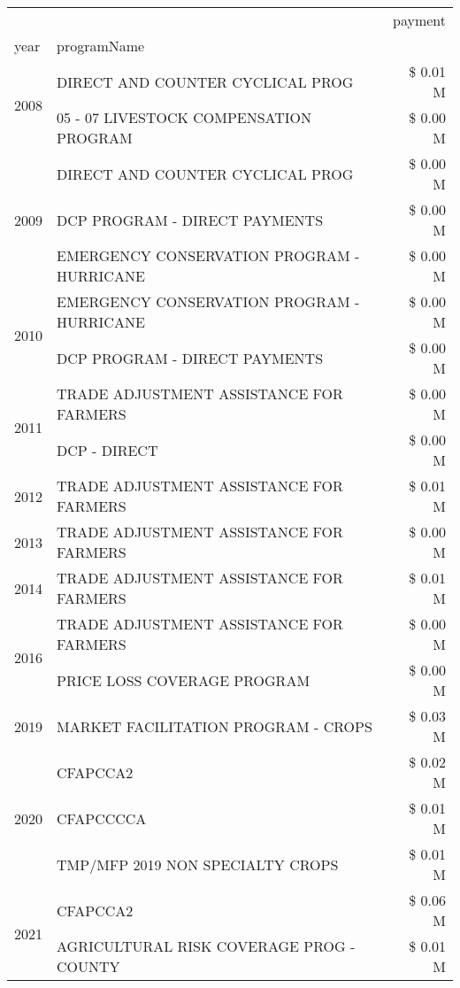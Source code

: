 \begin{tabular}{llr}
\toprule
 &  & payment \\
year & programName &  \\
\midrule
\multirow[t]{2}{*}{2008} & DIRECT AND COUNTER CYCLICAL PROG & \$ 0.01 M \\
 & 05 - 07 LIVESTOCK COMPENSATION PROGRAM & \$ 0.00 M \\
\cline{1-3}
\multirow[t]{3}{*}{2009} & DIRECT AND COUNTER CYCLICAL PROG & \$ 0.00 M \\
 & DCP PROGRAM - DIRECT PAYMENTS & \$ 0.00 M \\
 & EMERGENCY CONSERVATION PROGRAM - HURRICANE & \$ 0.00 M \\
\cline{1-3}
\multirow[t]{2}{*}{2010} & EMERGENCY CONSERVATION PROGRAM - HURRICANE & \$ 0.00 M \\
 & DCP PROGRAM - DIRECT PAYMENTS & \$ 0.00 M \\
\cline{1-3}
\multirow[t]{2}{*}{2011} & TRADE ADJUSTMENT ASSISTANCE FOR FARMERS & \$ 0.00 M \\
 & DCP - DIRECT & \$ 0.00 M \\
\cline{1-3}
2012 & TRADE ADJUSTMENT ASSISTANCE FOR FARMERS & \$ 0.01 M \\
\cline{1-3}
2013 & TRADE ADJUSTMENT ASSISTANCE FOR FARMERS & \$ 0.00 M \\
\cline{1-3}
2014 & TRADE ADJUSTMENT ASSISTANCE FOR FARMERS & \$ 0.01 M \\
\cline{1-3}
\multirow[t]{2}{*}{2016} & TRADE ADJUSTMENT ASSISTANCE FOR FARMERS & \$ 0.00 M \\
 & PRICE LOSS COVERAGE PROGRAM & \$ 0.00 M \\
\cline{1-3}
2019 & MARKET FACILITATION PROGRAM - CROPS & \$ 0.03 M \\
\cline{1-3}
\multirow[t]{3}{*}{2020} & CFAPCCA2 & \$ 0.02 M \\
 & CFAPCCCCA & \$ 0.01 M \\
 & TMP/MFP 2019 NON SPECIALTY CROPS & \$ 0.01 M \\
\cline{1-3}
\multirow[t]{2}{*}{2021} & CFAPCCA2 & \$ 0.06 M \\
 & AGRICULTURAL RISK COVERAGE PROG - COUNTY & \$ 0.01 M \\
\cline{1-3}
\bottomrule
\end{tabular}
